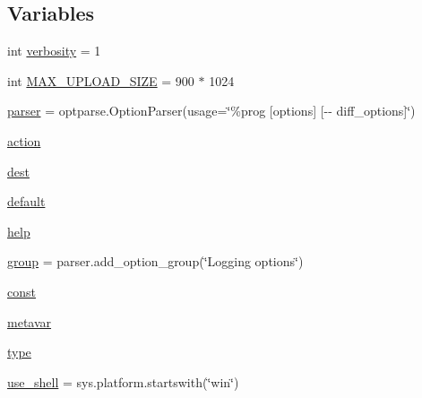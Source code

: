 \subsection*{Variables}
\begin{DoxyCompactItemize}
\item 
int \mbox{\hyperlink{namespacegoogletest-master_1_1googlemock_1_1scripts_1_1upload_a450883b5f5a2d11edb65f8882a11b995}{verbosity}} = 1
\item 
int \mbox{\hyperlink{namespacegoogletest-master_1_1googlemock_1_1scripts_1_1upload_a5b5b22790c63b81bee055a5f41d4715c}{M\+A\+X\+\_\+\+U\+P\+L\+O\+A\+D\+\_\+\+S\+I\+ZE}} = 900 $\ast$ 1024
\item 
\mbox{\hyperlink{namespacegoogletest-master_1_1googlemock_1_1scripts_1_1upload_a1d8512763b61ca51229cf811a84c8328}{parser}} = optparse.\+Option\+Parser(usage=\char`\"{}\%prog \mbox{[}options\mbox{]} \mbox{[}-\/-\/ diff\+\_\+options\mbox{]}\char`\"{})
\item 
\mbox{\hyperlink{namespacegoogletest-master_1_1googlemock_1_1scripts_1_1upload_ae352e8b9e52a3e6d6113e588bb8e6644}{action}}
\item 
\mbox{\hyperlink{namespacegoogletest-master_1_1googlemock_1_1scripts_1_1upload_aa2ffc66370965e33e10cf43a7fb6ffdc}{dest}}
\item 
\mbox{\hyperlink{namespacegoogletest-master_1_1googlemock_1_1scripts_1_1upload_aee69061f3d2629e2a0a3b8a87c40d9ed}{default}}
\item 
\mbox{\hyperlink{namespacegoogletest-master_1_1googlemock_1_1scripts_1_1upload_a73d48d189f9518c260d4344b5489e3fc}{help}}
\item 
\mbox{\hyperlink{namespacegoogletest-master_1_1googlemock_1_1scripts_1_1upload_ab3d587b2dffeed06bb92df813e1f382d}{group}} = parser.\+add\+\_\+option\+\_\+group(\char`\"{}Logging options\char`\"{})
\item 
\mbox{\hyperlink{namespacegoogletest-master_1_1googlemock_1_1scripts_1_1upload_a949e40a39895effaf1d448f44987aa69}{const}}
\item 
\mbox{\hyperlink{namespacegoogletest-master_1_1googlemock_1_1scripts_1_1upload_ad1cb47051b62c4a6c709d7548b185a64}{metavar}}
\item 
\mbox{\hyperlink{namespacegoogletest-master_1_1googlemock_1_1scripts_1_1upload_a43329293fdfc5c98e42a7239bb9a14c8}{type}}
\item 
\mbox{\hyperlink{namespacegoogletest-master_1_1googlemock_1_1scripts_1_1upload_a7b94f5547ef6c594813dc3e2b3558439}{use\+\_\+shell}} = sys.\+platform.\+startswith(\char`\"{}win\char`\"{})
\end{DoxyCompactItemize}


